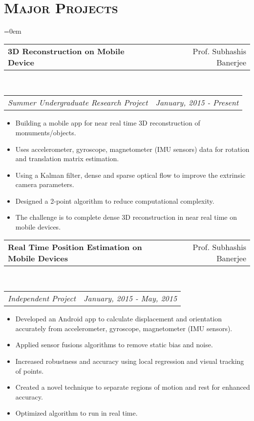 \documentclass{article}
\makeatletter
\newcommand{\headerrow}[2]
{\begin{tabular*}{\linewidth}{l@{\extracolsep{\fill}}r}
	#1 &
	#2 \\
\end{tabular*}}
\newcommand{\tmpsection}[1]{}
\let\tmpsection=\section
\renewcommand{\section}[1]{\tmpsection*{\textsc{#1}}}
\makeatother
\begin{document}
\section{Major Projects}
\begin{list} {}{\leftmargin=0em}
\setlength{\leftmargin}{0pt}
\item[]
  \headerrow
    {\textbf{3D Reconstruction on Mobile Device}}
    {Prof. Subhashis Banerjee}
  \\
  \headerrow
    {\emph{Summer Undergraduate Research Project}}
    {\emph{January, 2015 - Present}}
      \begin{itemize}
        \item Building a mobile app for near real time 3D reconstruction of monuments/objects.
        \item Uses accelerometer, gyroscope, magnetometer (IMU sensors) data for rotation and translation matrix estimation. 
        \item Using a Kalman filter, dense and sparse optical flow to improve the extrinsic camera parameters. 
        \item Designed a 2-point algorithm to reduce computational complexity. 
        \item The challenge is to complete dense 3D reconstruction in near real time on mobile devices.
      \end{itemize}

\item[]
  \item[]
  \headerrow
  {\textbf{Real Time Position Estimation on Mobile Devices}}
  {Prof. Subhashis Banerjee}
  \\
  \headerrow
    {\emph{Independent Project}}
    {\emph{January, 2015 - May, 2015}}

    \begin{itemize}
      \item Developed an Android app to calculate displacement and orientation accurately from accelerometer, gyroscope, magnetometer (IMU sensors).

      \item Applied sensor fusions algorithms to remove static bias and noise.
      \item Increased robustness and accuracy using local regression and visual tracking of points.
      \item Created a novel technique to separate regions of motion and rest for enhanced accuracy.
      \item Optimized algorithm to run in real time.
    \end{itemize}


\end{list}
\end{document}
